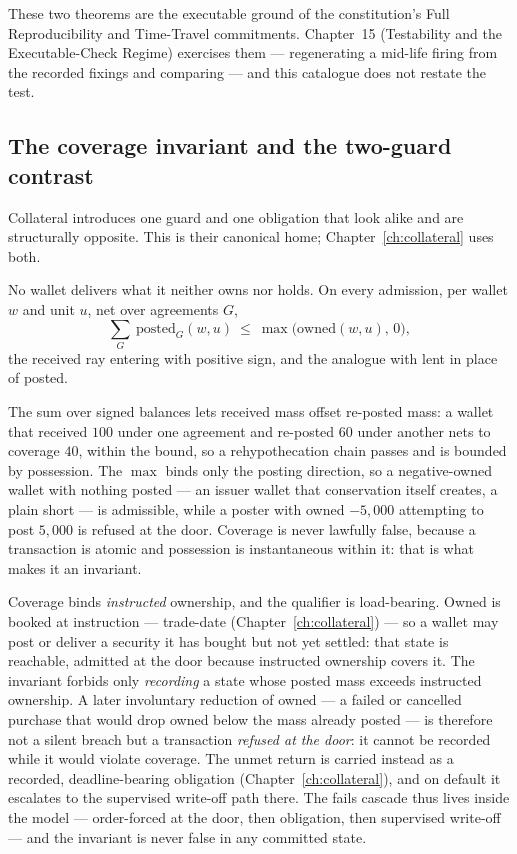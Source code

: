 These two theorems are the executable ground of the constitution's Full
Reproducibility and Time-Travel commitments. Chapter~15 (Testability and the
Executable-Check Regime) exercises them --- regenerating a mid-life firing from
the recorded fixings and comparing --- and this catalogue does not restate the
test.

\subsection{The coverage invariant and the two-guard contrast}

Collateral introduces one guard and one obligation that look alike and are
structurally opposite. This is their canonical home; Chapter~\ref{ch:collateral}
uses both.

\begin{invariant}\label{inv:coverage}
No wallet delivers what it neither owns nor holds. On every admission, per wallet
$w$ and unit $u$, net over agreements $G$,
\[
\sum_{G}\ \mathrm{posted}_G(w,u)\ \le\ \max\bigl(\mathrm{owned}(w,u),\,0\bigr),
\]
the received ray entering with positive sign, and the analogue with lent in place
of posted.
\end{invariant}

The sum over signed balances lets received mass offset re-posted mass: a wallet
that received $100$ under one agreement and re-posted $60$ under another nets to
coverage $40$, within the bound, so a rehypothecation chain passes and is bounded
by possession. The $\max$ binds only the posting direction, so a negative-owned
wallet with nothing posted --- an issuer wallet that conservation itself creates,
a plain short --- is admissible, while a poster with owned $-5{,}000$ attempting to
post $5{,}000$ is refused at the door. Coverage is never lawfully false, because a
transaction is atomic and possession is instantaneous within it: that is what
makes it an invariant.

Coverage binds \emph{instructed} ownership, and the qualifier is load-bearing. Owned is
booked at instruction --- trade-date (Chapter~\ref{ch:collateral}) --- so a wallet may
post or deliver a security it has bought but not yet settled: that state is reachable,
admitted at the door because instructed ownership covers it. The invariant forbids only
\emph{recording} a state whose posted mass exceeds instructed ownership. A later
involuntary reduction of owned --- a failed or cancelled purchase that would drop owned
below the mass already posted --- is therefore not a silent breach but a transaction
\emph{refused at the door}: it cannot be recorded while it would violate coverage. The
unmet return is carried instead as a recorded, deadline-bearing obligation
(Chapter~\ref{ch:collateral}), and on default it escalates to the supervised write-off
path there. The fails cascade thus lives inside the model --- order-forced at the door,
then obligation, then supervised write-off --- and the invariant is never false in any
committed state.

